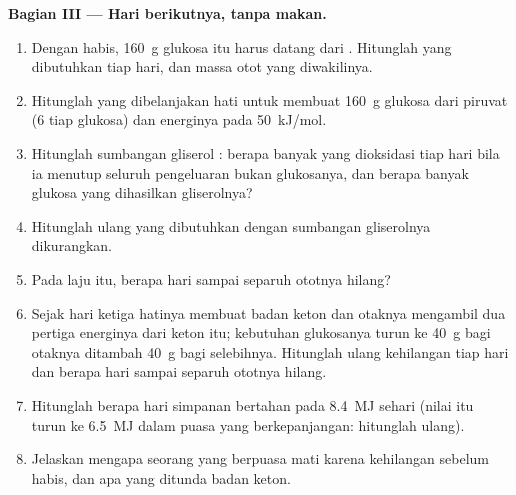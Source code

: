 \begin{problem}
\medskip
\noindent\textbf{Bagian III --- Hari berikutnya, tanpa makan.}
\begin{enumerate}[resume]
  \item Dengan  habis, \qty{160}{g} glukosa itu harus datang
        dari . Hitunglah  yang dibutuhkan tiap
        hari, dan massa otot yang diwakilinya.
  \item Hitunglah  yang dibelanjakan hati untuk membuat \qty{160}{g}
        glukosa dari piruvat (6  tiap glukosa) dan energinya pada
        \qty{50}{kJ/mol}.
  \item Hitunglah sumbangan gliserol : berapa banyak  yang
        dioksidasi tiap hari bila ia menutup seluruh pengeluaran bukan
        glukosanya, dan berapa banyak glukosa yang dihasilkan
        gliserolnya?
  \item Hitunglah ulang  yang dibutuhkan dengan sumbangan
        gliserolnya dikurangkan.
  \item Pada laju itu, berapa hari sampai separuh ototnya hilang?
  \item Sejak hari ketiga hatinya membuat badan keton dan otaknya
        mengambil dua pertiga energinya dari keton itu; kebutuhan
        glukosanya turun ke \qty{40}{g} bagi otaknya ditambah
        \qty{40}{g} bagi selebihnya. Hitunglah ulang kehilangan
         tiap hari dan berapa hari sampai separuh ototnya
        hilang.
  \item Hitunglah berapa hari simpanan  bertahan pada
        \qty{8.4}{MJ} sehari (nilai itu turun ke \qty{6.5}{MJ} dalam
        puasa yang berkepanjangan: hitunglah ulang).
  \item Jelaskan mengapa seorang yang berpuasa mati karena kehilangan
         sebelum  habis, dan apa yang ditunda badan
        keton.
\end{enumerate}


\end{problem}

